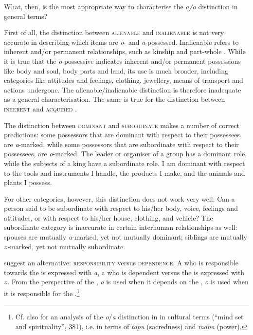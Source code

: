 What, then, is the most appropriate way to characterise the \textit{{\ꞌ}a/o} distinction in general terms?

First of all, the distinction between \textsc{alienable} and \textsc{inalienable} is not very accurate in describing which items are \textit{o}{}- and \textit{a}{}-possessed. Inalienable  refers to inherent and/or permanent relationships, such as kinship and part-whole \citep[185]{Dryer2007Noun}. While it is true that the \textit{o}{}-possessive indicates inherent and/or permanent possessions like body and soul, body parts and land, its use is much broader, including categories like attitudes and feelings, clothing, jewellery, means of transport and actions undergone. The alienable/inalienable distinction is therefore inadequate as a general characterisation. The same is true for the distinction between \textsc{inherent} and \textsc{acquired} .

The distinction between \textsc{dominant} and \textsc{subordinate} makes a number of correct predictions: some possessors that are dominant with respect to their possessees, are \textit{a}{}-marked, while some possessors that are subordinate with respect to their possessees, are \textit{o}{}-marked. The leader or organiser of a group has a dominant role, while the subjects of a king have a subordinate role. I am dominant with respect to the tools and instruments I handle, the products I make, and the animals and plants I possess.

For other categories, however, this distinction does not work very well. Can a person said to be subordinate with respect to his/her body, voice, feelings and attitudes, or with respect to his/her house, clothing, and vehicle? The subordinate category is inaccurate in certain interhuman relationships as well: spouses are mutually \textit{{\ꞌ}a}{}-marked, yet not mutually dominant; siblings are mutually \textit{o-}marked, yet not mutually subordinate. 

\citet{MulloyRapu1977} suggest an alternative: \textsc{responsibility} versus \textsc{dependence}. A  who is responsible towards the  is expressed with \textit{{\ꞌ}a}, a  who is dependent versus the  is expressed with \textit{o}. From the perspective of the , \textit{{\ꞌ}a} is used when it depends on the , \textit{o} is used when it is responsible for the .\footnote{\label{fn:305}Cf. also \citet{Thornton1998} for an analysis of the \textit{o}/\textit{a} distinction in  in cultural terms (“mind set and spirituality”, 381), i.e. in terms of \textit{tapu} (sacredness) and \textit{mana} (power).}

